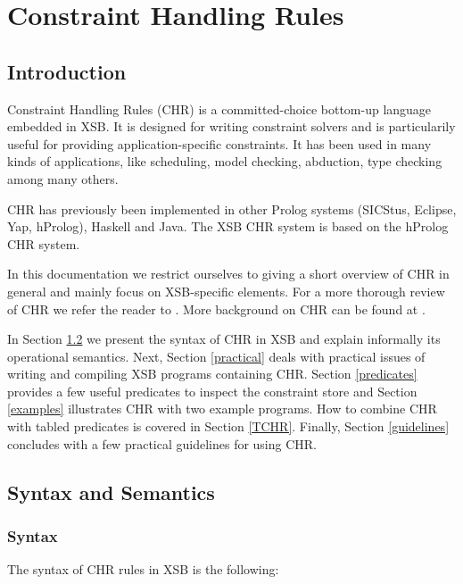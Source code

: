 \chapter{Constraint Handling Rules} \label{chr}

\section{Introduction}

Constraint Handling Rules (CHR) is a committed-choice bottom-up
language embedded in XSB. It is designed for writing constraint
solvers and is particularily useful for providing application-specific
constraints.  It has been used in many kinds of applications, like
scheduling, model checking, abduction, type checking among many
others.

CHR has previously been implemented in other Prolog systems (SICStus,
Eclipse, Yap, hProlog), Haskell and Java. The XSB CHR system is based on
the hProlog CHR system.

In this documentation we restrict ourselves to giving a short overview
of CHR in general and mainly focus on XSB-specific elements.  For a
more thorough review of CHR we refer the reader to
\cite{chr_survey}. More background on CHR can be found at
\cite{chr_site}.

In Section \ref{SyntaxAndSemantics} we present the syntax of CHR in XSB and
explain informally its operational semantics. Next, Section \ref{practical}
deals with practical issues of writing and compiling XSB programs containing
CHR. Section \ref{predicates} provides a few useful predicates to inspect
the constraint store and Section \ref{examples} illustrates CHR with two
example programs. How to combine CHR with tabled predicates is covered in
Section \ref{TCHR}. Finally, Section \ref{guidelines} concludes with a few
practical guidelines for using CHR.


\section{Syntax and Semantics} \label{SyntaxAndSemantics}

\subsection{Syntax}

The syntax of CHR rules in XSB is the following:

